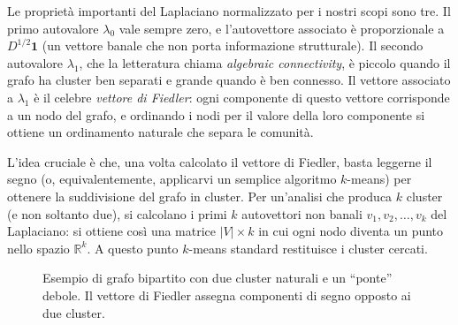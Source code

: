 Le propriet\`a importanti del Laplaciano normalizzato per i
nostri scopi sono tre. Il primo autovalore $\lambda_0$ vale
sempre zero, e l'autovettore associato \`e proporzionale a
$D^{1/2}\mathbf{1}$ (un vettore banale che non porta
informazione strutturale). Il secondo autovalore
$\lambda_1$, che la letteratura chiama \emph{algebraic
connectivity}, \`e piccolo quando il grafo ha cluster ben
separati e grande quando \`e ben connesso. Il vettore
associato a $\lambda_1$ \`e il celebre \emph{vettore di
Fiedler}: ogni componente di questo vettore corrisponde a un
nodo del grafo, e ordinando i nodi per il valore della loro
componente si ottiene un ordinamento naturale che separa le
comunit\`a.

L'idea cruciale \`e che, una volta calcolato il vettore di
Fiedler, basta leggerne il segno (o, equivalentemente,
applicarvi un semplice algoritmo $k$-means) per ottenere la
suddivisione del grafo in cluster. Per un'analisi che produca
$k$ cluster (e non soltanto due), si calcolano i primi $k$
autovettori non banali $v_1, v_2, \ldots, v_k$ del Laplaciano:
si ottiene cos\`i una matrice $|V| \times k$ in cui ogni nodo
diventa un punto nello spazio $\mathbb{R}^k$. A questo punto
$k$-means standard restituisce i cluster cercati.

\begin{figure}[h]
\centering
{}
\caption{Esempio di grafo bipartito con due cluster naturali
e un ``ponte'' debole. Il vettore di Fiedler assegna
componenti di segno opposto ai due cluster.}
\label{fig:spettrale-cluster}
\end{figure}

